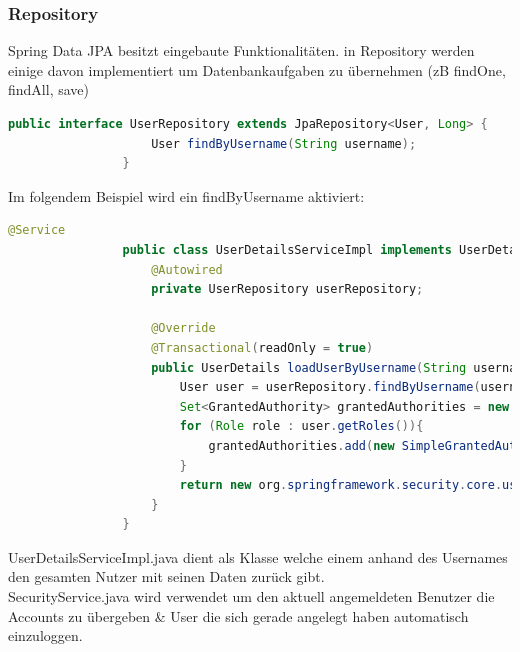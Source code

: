         
        \subsubsection{Repository}
            Spring Data JPA besitzt eingebaute Funktionalitäten. in Repository werden einige davon implementiert um Datenbankaufgaben zu übernehmen (zB ﬁndOne, ﬁndAll, save) 
            
            \begin{lstlisting}[language = java]
                public interface UserRepository extends JpaRepository<User, Long> { 
                    User findByUsername(String username); 
                }
            \end{lstlisting}
            
            Im folgendem Beispiel wird ein ﬁndByUsername aktiviert:
            
            \begin{lstlisting}[language = java]
                @Service 
                public class UserDetailsServiceImpl implements UserDetailsService{ 
                    @Autowired 
                    private UserRepository userRepository;
    
                    @Override 
                    @Transactional(readOnly = true) 
                    public UserDetails loadUserByUsername(String username) throws UsernameNotFoundException { 
                        User user = userRepository.findByUsername(username);
                        Set<GrantedAuthority> grantedAuthorities = new HashSet<>(); 
                        for (Role role : user.getRoles()){ 
                            grantedAuthorities.add(new SimpleGrantedAuthority(role.getName()));
                        }
                        return new org.springframework.security.core.userdetails.User(user.getUsername() , user. getPassword() , grantedAuthorities);
                    }
                }
            \end{lstlisting}
            
            UserDetailsServiceImpl.java dient als Klasse welche einem anhand des Usernames den gesamten Nutzer mit seinen Daten zurück gibt. \\
            
            SecurityService.java wird verwendet um den aktuell angemeldeten Benutzer die Accounts zu übergeben & User die sich gerade angelegt haben automatisch einzuloggen. \\
                
